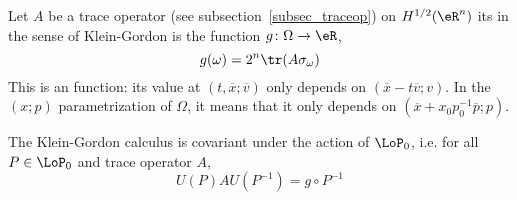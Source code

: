 Let $A$ be a trace operator (see subsection~\ref{subsec_traceop}) on $H^{1/2}(\eR^n)$ its  in the sense of Klein-Gordon is the function $g\colon \Omega\to \eR$,
\begin{equation}
	g(\omega)=2^n\tr(A\sigma_{\omega})\end{equation}
This is an  function: its value at $(t,\overline{x};\overline{v})$ only depends on $(\overline{x}-t\overline{v};v)$. In the $(x;p)$ parametrization of $\Omega$, it means that it only depends on $(\overline{x}+x_0p_0^{-1}\overline{p};p)$.

\begin{proposition}
	The Klein-Gordon calculus is covariant under the action of $\LoP_0$, i.e. for all $P\in\LoP_0$ and trace operator $A$,
	\[
		U(P)A U(P^{-1})=g\circ P^{-1}
	\]

\end{proposition}

